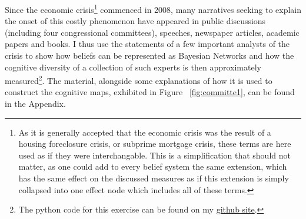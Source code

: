 \documentclass[12pt]{article}
\begin{document}
Since the economic crisis\footnote{As it is generally accepted that the economic crisis was the result of a housing foreclosure crisis, or subprime mortgage crisis, these terms are here used as if they were interchangable. This is a simplification that should not matter, as one could add to every belief system the same extension, which has the same effect on the discussed measures as if this extension is simply collapsed into one effect node which includes all of these terms.} commenced in 2008, many narratives seeking to explain the onset of this costly phenomenon have appeared in public discussions (including four congressional committees), speeches, newspaper articles, academic papers and books. I thus use the statements of a few important analysts of the crisis to show how beliefs can be represented as Bayesian Networks and how the cognitive diversity of a collection of such experts is then approximately measured\footnote{The python code for this exercise can be found on my \href{https://github.com/jac2130}{github site}.}. The material, alongside some explanations of how it is used to construct the cognitive maps, exhibited in Figure ~\ref{fig:committe1}, can be found in the Appendix.
\end{document}
